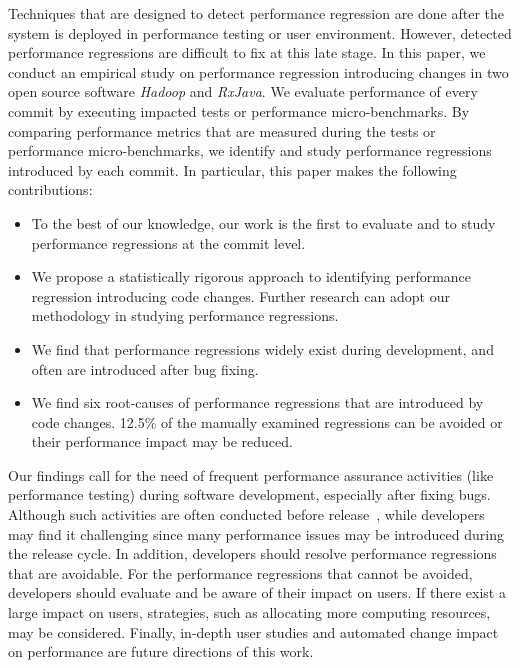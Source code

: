 Techniques that are designed to detect performance regression are done after the system is deployed in performance testing or user environment. However, detected performance regressions are difficult to fix at this late stage. In this paper, we conduct an empirical study on performance regression introducing changes in two open source software \emph{Hadoop} and \emph{RxJava}. We evaluate performance of every commit by executing impacted tests or performance micro-benchmarks. By comparing performance metrics that are measured during the tests or performance micro-benchmarks, we identify and study performance regressions introduced by each commit. In particular, this paper makes the following contributions:
\vspace{-0.2cm}
\begin{itemize} \itemsep 0em
\item To the best of our knowledge, our work is the first to evaluate and to study performance regressions at the commit level. 
\item We propose a statistically rigorous approach to identifying performance regression introducing code changes. Further research can adopt our methodology in studying performance regressions.
\item We find that performance regressions widely exist during development, and often are introduced after bug fixing.
\item We find six root-causes of performance regressions that are introduced by code changes. 12.5\% of the manually examined regressions can be avoided or their performance impact may be reduced.
\end{itemize}
\vspace{-0.2cm}
Our findings call for the need of frequent performance assurance activities (like performance testing) during software development, especially after fixing bugs. Although such activities are often conducted before release~\cite{jacktse}, while developers may find it challenging since many performance issues may be introduced during the release cycle. In addition, developers should resolve performance regressions that are avoidable. For the performance regressions that cannot be avoided, developers should evaluate and be aware of their impact on users. If there exist a large impact on users, strategies, such as allocating more computing resources, may be considered. Finally, in-depth user studies and automated change impact on performance are future directions of this work.  
